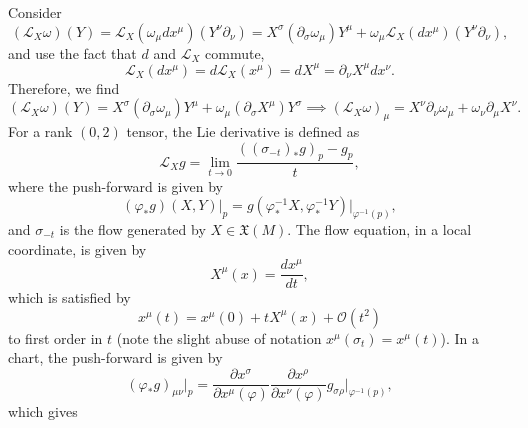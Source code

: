 \begin{solution}
    Consider 
    \begin{equation}
        (\mathcal{L}_X\omega)(Y) = \mathcal{L}_X(\omega_\mu dx^\mu)(Y^\nu\partial_\nu) = X^\sigma(\partial_\sigma\omega_\mu)Y^\mu + \omega_\mu\mathcal{L}_X(dx^\mu)(Y^\nu \partial_\nu),
    \end{equation}
    and use the fact that $d$ and $\mathcal{L}_X$ commute,
    \begin{equation}
        \mathcal{L}_X(dx^\mu) =d\mathcal{L}_X(x^\mu) = dX^\mu =\partial_\nu X^\mu dx^\nu.
    \end{equation}
    Therefore, we find
    \begin{equation}
        (\mathcal{L}_X\omega)(Y) = X^\sigma(\partial_\sigma\omega_\mu)Y^\mu + \omega_\mu(\partial_\sigma X^\mu)Y^\sigma \implies (\mathcal{L}_X\omega)_\mu = X^\nu\partial_\nu\omega_\mu + \omega_\nu\partial_\mu X^\nu.
    \end{equation}
    For a rank $(0,2)$ tensor, the Lie derivative is defined as
    \begin{equation}
        \mathcal{L}_Xg = \lim_{t\to0}\frac{((\sigma_{-t}) _*g)_p -g_p}{t},
    \end{equation}
    where the push-forward is given by 
    \begin{equation}
        (\varphi_* g)(X,Y)\bigg|_p =g(\varphi^{-1}_*X,\varphi^{-1}_*Y)\bigg|_{\varphi^{-1}(p)},
    \end{equation}
    and $\sigma_{-t}$ is the flow generated by $X\in \mathfrak{X}(M)$. The flow equation, in a local coordinate, is given by
    \begin{equation}
        X^\mu(x) = \frac{dx^\mu}{dt},
    \end{equation}
    which is satisfied by
    \begin{equation}
        x^\mu(t) = x^\mu(0) +tX^\mu(x) + \mathcal{O}(t^2)
        \label{eq:flow}
    \end{equation}
    to first order in $t$ (note the slight abuse of notation $x^\mu(\sigma_t) = x^\mu (t)$). In a chart, the push-forward is given by
    \begin{equation}
        (\varphi_* g)_{\mu\nu}\bigg|_p  = \frac{\partial x^\sigma}{\partial x^\mu(\varphi)}\frac{\partial x^\rho}{\partial x^\nu(\varphi)}g_{\sigma\rho}\bigg|_{\varphi^{-1}(p)},
    \end{equation}
    which gives
    \begin{equation}
    \begin{aligned}

\end{aligned}
\end{equation}
\end{solution}

